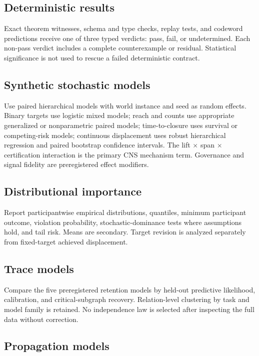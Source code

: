 \documentclass[11pt]{article}
\begin{document}
\subsection{Deterministic results}

Exact theorem witnesses, schema and type checks, replay tests, and codeword predictions receive one of three typed verdicts: pass, fail, or undetermined. Each non-pass verdict includes a complete counterexample or residual. Statistical significance is not used to rescue a failed deterministic contract.

\subsection{Synthetic stochastic models}

Use paired hierarchical models with world instance and seed as random effects. Binary targets use logistic mixed models; reach and counts use appropriate generalized or nonparametric paired models; time-to-closure uses survival or competing-risk models; continuous displacement uses robust hierarchical regression and paired bootstrap confidence intervals. The lift $\times$ span $\times$ certification interaction is the primary CNS mechanism term. Governance and signal fidelity are preregistered effect modifiers.

\subsection{Distributional importance}

Report participantwise empirical distributions, quantiles, minimum participant outcome, violation probability, stochastic-dominance tests where assumptions hold, and tail risk. Means are secondary. Target revision is analyzed separately from fixed-target achieved displacement.

\subsection{Trace models}

Compare the five preregistered retention models by held-out predictive likelihood, calibration, and critical-subgraph recovery. Relation-level clustering by task and model family is retained. No independence law is selected after inspecting the full data without correction.

\subsection{Propagation models}
\end{document}
